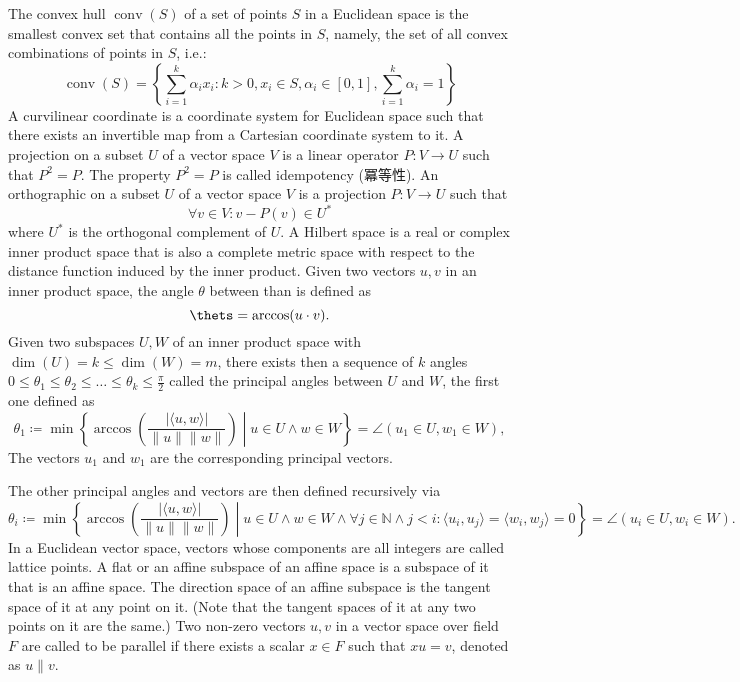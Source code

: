 \documentclass[a4paper,12pt]{report}
\begin{document}
The convex hull $\operatorname{conv} (S)$ of a set of points $S$ in a Euclidean space is the smallest convex set that contains all the points in $S$, namely, the set of all convex combinations of points in $S$, i.e.:
\[\operatorname{conv}(S)=\left\{\sum _{i=1}^k\alpha _ix_i\colon k>0,x_i\in S,\alpha _i\in [0,1],\sum _{i=1}^k\alpha _i=1\right\}\]
A curvilinear coordinate is a coordinate system for Euclidean space such that there exists an invertible map from a Cartesian coordinate system to it.
A projection on a subset $U$ of a vector space $V$ is a linear operator $P\colon V\to U$ such that $P^2=P$. The property $P^2=P$ is called idempotency (冪等性).
An orthographic on a subset $U$ of a vector space $V$ is a projection $P\colon V\to U$  such that 
\[ \forall v\in V\colon v - P(v)\in U^*\]
where $U^*$ is the orthogonal complement of \( U \).
A Hilbert space is a real or complex inner product space that is also a complete metric space with respect to the distance function induced by the inner product.
Given two vectors $u,v$ in an inner product space, the angle $\theta$ between than is defined as
\[\thets=\arccos(u\cdot v).\]
Given two subspaces $U,W$ of an inner product space with $\dim(U)=k\leq\dim(W)=m$, there exists then a sequence of $k$ angles $0\leq\theta_1\leq\theta_2\leq\ldots\leq\theta_k\leq\frac{\pi}{2}$ called the principal angles between $U$ and $W$, the first one defined as
\[\theta_1\coloneq\min\left\{\arccos\left(\frac{|\langle u,w\rangle|}{\|u\|\|w\|}\right)\middle |u\in U\land w\in W\right\}=\angle(u_1\in U,w_1\in W),\]
The vectors $u_1$ and $w_1$ are the corresponding principal vectors.

The other principal angles and vectors are then defined recursively via
\[\theta_i\coloneq\min\left\{\arccos\left(\frac{|\langle u,w\rangle|}{\|u\|\|w\|}\right)\middle |u\in U\land w\in W\land \forall j\in\mathbb{N}\land j<i\colon\langle u_i,u_j\rangle=\langle w_i,w_j\rangle=0\right\}=\angle(u_i\in U,w_i\in W).\]
In a Euclidean vector space, vectors whose components are all integers are called lattice points.
A flat or an affine subspace of an affine space is a subspace of it that is an affine space.
The direction space of an affine subspace is the tangent space of it at any point on it. (Note that the tangent spaces of it at any two points on it are the same.)
Two non-zero vectors $u,v$ in a vector space over field $F$ are called to be parallel if there exists a scalar $x\in F$ such that $xu=v$, denoted as $u\parallel v$.
\end{document}
